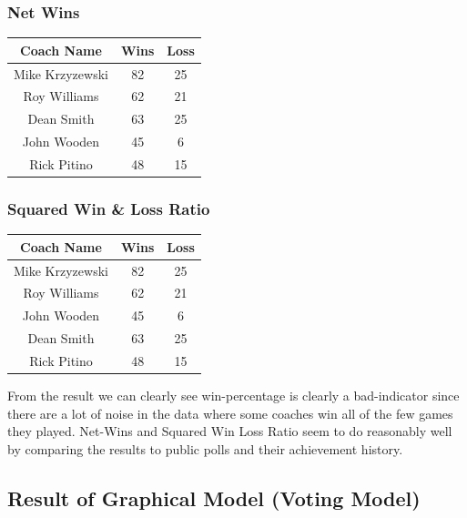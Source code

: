 \documentclass[titlepage]{article}
\begin{document}
\subsubsection*{Net Wins}

\begin{center}
\begin{tabular}{ | c | c | c| }
\hline
Coach Name       & Wins   & Loss \\\hline
Mike Krzyzewski  & 82     & 25 \\\hline
Roy  Williams    & 62     & 21 \\\hline
Dean Smith       & 63     & 25 \\\hline
John Wooden      & 45     & 6 \\\hline
Rick Pitino      & 48     & 15 \\
\hline
\end{tabular}
\end{center}

\subsubsection*{Squared Win \& Loss Ratio}

\begin{center}
\begin{tabular}{ | c | c | c| }
\hline
Coach Name       & Wins   & Loss \\\hline
Mike Krzyzewski  & 82     & 25 \\\hline
Roy  Williams    & 62     & 21 \\\hline
John Wooden      & 45     & 6 \\\hline
Dean Smith       & 63     & 25 \\\hline
Rick Pitino      & 48     & 15 \\
\hline
\end{tabular}
\end{center}

\noindent From the result we can clearly see win-percentage is clearly a bad-indicator since there are a lot of noise in the data where some coaches win all of the few games they played. Net-Wins and Squared Win Loss Ratio seem to do reasonably well by comparing the results to public polls and their achievement history.

\subsection{Result of Graphical Model (Voting Model)}
\end{document}
